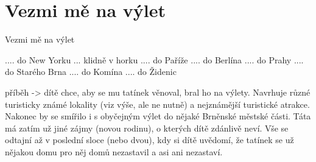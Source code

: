 \section{Vezmi mě na výlet}

Vezmi mě na výlet

.... do New Yorku ... klidně v horku
.... do Paříže
.... do Berlína 
.... do Prahy
.... do Starého Brna
.... do Komína
.... do Židenic


příběh -> dítě chce, aby se mu tatínek věnoval, bral ho na výlety. Navrhuje různé turisticky známé lokality (viz výše, ale ne nutně) a nejznámější turistické atrakce. Nakonec by se smířilo i s obyčejným výlet do nějaké Brněnské městské části. Táta má zatím už jiné zájmy (novou rodinu), o kterých dítě zdánlivě neví. Vše se odtajní až v poslední sloce (nebo dvou), kdy si dítě uvědomí, že tatínek se už nějakou domu pro něj domů nezastavil a asi ani nezastaví.
